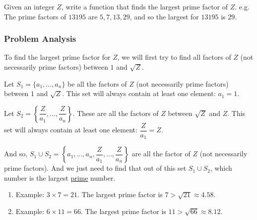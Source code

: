 \documentclass[12pt]{article}
\begin{document}
Given an integer $Z$, write a function that finds the largest prime factor of $Z$. e.g. The prime factors of $13195$ are $5, 7, 13, 29$, and so the largest for $13195$ is $29$.

\subsubsection*{Problem Analysis}
To find the largest prime factor for $Z$, we will first try to find all factors of $Z$ (not necessarily prime factors) between $1$ and $\sqrt{Z}$. 

Let $S_1 = \{a_1, \ldots, a_n\}$ be all the factors of $Z$ (not necessarily prime factors) between $1$ and $\sqrt{Z}$. This set will always contain at least one element: $a_1 = 1$.

Let $S_2 = \left\{\dfrac{Z}{a_1},\ldots, \dfrac{Z}{a_n}\right\}$. These are all the factors of $Z$ between $\sqrt{Z}$ and $Z$. This set will always contain at least one element: $\dfrac{Z}{a_1} = Z$.

And so, $S_1 \cup S_2 =  \left\{a_1, \ldots, a_n, \dfrac{Z}{a_1},\ldots, \dfrac{Z}{a_n}\right\}$ are all the factor of $Z$ (not necessarily prime factors). And we just need to find that out of this set $S_1 \cup S_2$, which number is the largest \underline{prime} number.

\begin{enumerate}
\item Example: $3 \times 7 = 21$. The largest prime factor is $7 > \sqrt{21} \approx 4.58$.

\item Example: $6 \times 11 = 66$. The largest prime factor is $11 > \sqrt{66} \approx 8.12$.
\end{enumerate}
\end{document}

